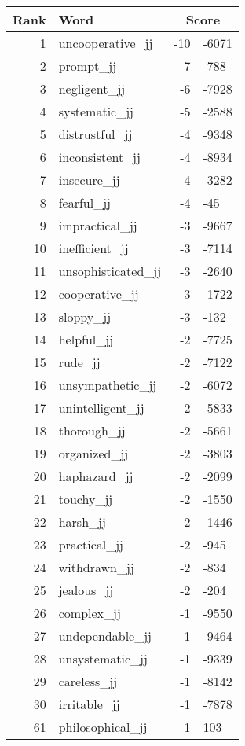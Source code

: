 \begin{longtable}[!htbp]{| rlr@{.}l |}
    \hline
    \textbf{Rank} & \textbf{Word} & \multicolumn{2}{c|}{\textbf{Score}} \\
    \hline
    \endhead
    1 & uncooperative\_jj & -10 & -6071 \\
    2 & prompt\_jj & -7 & -788 \\
    3 & negligent\_jj & -6 & -7928 \\
    4 & systematic\_jj & -5 & -2588 \\
    5 & distrustful\_jj & -4 & -9348 \\
    6 & inconsistent\_jj & -4 & -8934 \\
    7 & insecure\_jj & -4 & -3282 \\
    8 & fearful\_jj & -4 & -45 \\
    9 & impractical\_jj & -3 & -9667 \\
    10 & inefficient\_jj & -3 & -7114 \\
    11 & unsophisticated\_jj & -3 & -2640 \\
    12 & cooperative\_jj & -3 & -1722 \\
    13 & sloppy\_jj & -3 & -132 \\
    14 & helpful\_jj & -2 & -7725 \\
    15 & rude\_jj & -2 & -7122 \\
    16 & unsympathetic\_jj & -2 & -6072 \\
    17 & unintelligent\_jj & -2 & -5833 \\
    18 & thorough\_jj & -2 & -5661 \\
    19 & organized\_jj & -2 & -3803 \\
    20 & haphazard\_jj & -2 & -2099 \\
    21 & touchy\_jj & -2 & -1550 \\
    22 & harsh\_jj & -2 & -1446 \\
    23 & practical\_jj & -2 & -945 \\
    24 & withdrawn\_jj & -2 & -834 \\
    25 & jealous\_jj & -2 & -204 \\
    26 & complex\_jj & -1 & -9550 \\
    27 & undependable\_jj & -1 & -9464 \\
    28 & unsystematic\_jj & -1 & -9339 \\
    29 & careless\_jj & -1 & -8142 \\
    30 & irritable\_jj & -1 & -7878 \\
    61 & philosophical\_jj & 1 & 103 \\

\end{longtable}
